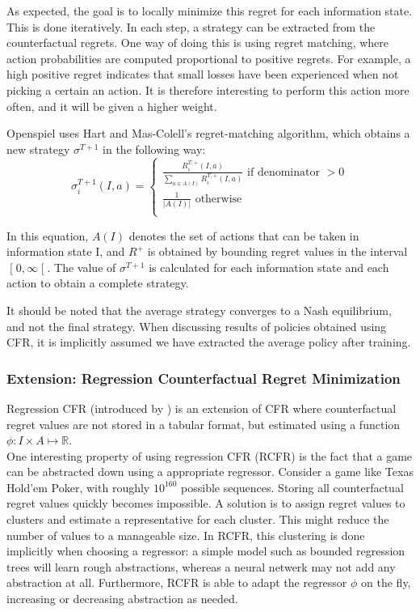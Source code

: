 \documentclass[10pt,a4paper]{article}
\begin{document}
As expected, the goal is to locally minimize this regret for each information state. This is done iteratively. In each step, a strategy can be extracted from the counterfactual regrets. One way of doing this is using regret matching, where action probabilities are computed proportional to positive regrets. For example, a high positive regret indicates that small losses have been experienced when not picking a certain an action. It is therefore interesting to perform this action more often, and it will be given a higher weight.

Openspiel uses Hart and Mas-Colell's regret-matching algorithm, which obtains a new strategy $\sigma^{T+1}$ in the following way:
\begin{equation}
\sigma_{i}^{T+1}(I,a) = 
	\begin{cases}
	\frac{R_{i}^{T,+}(I,a)}{\sum_{a \in A(I)}{R_{i}^{T,+}(I,a)}} \text{ if denominator }> 0 \\
	\frac{1}{|A(I)|} \text{ otherwise}\\
	\end{cases}
\end{equation}

In this equation, $A(I)$ denotes the set of actions that can be taken in information state I, and $R^+$ is obtained by bounding regret values in the interval $\mathclose[0,\infty\mathclose[$. The value of $\sigma^{T+1}$ is calculated for each information state and each action to obtain a complete strategy.

It should be noted that the average strategy converges to a Nash equilibrium, and not the final strategy. When discussing results of policies obtained using CFR, it is implicitly assumed we have extracted the average policy after training.

\subsubsection{Extension: Regression Counterfactual Regret Minimization}
Regression CFR (introduced by \citeauthor{regression_cfr} \citep{regression_cfr}) is an extension of CFR where counterfactual regret values are not stored in a tabular format, but estimated using a function $\phi: I \times A \mapsto \mathbb{R}$.\\

One interesting property of using regression CFR (RCFR) is the fact that a game can be abstracted down using a appropriate regressor. Consider a game like Texas Hold'em Poker, with roughly $10^{160}$ possible sequences. Storing all counterfactual regret values quickly becomes impossible. A solution is to assign regret values to clusters and estimate a representative for each cluster. This might reduce the number of values to a manageable size. In RCFR, this clustering is done implicitly when choosing a regressor: a simple model such as bounded regression trees will learn rough abstractions, whereas a neural netwerk may not add any abstraction at all. Furthermore, RCFR is able to adapt the regressor $\phi$ on the fly, increasing or decreasing abstraction as needed.
\end{document}
